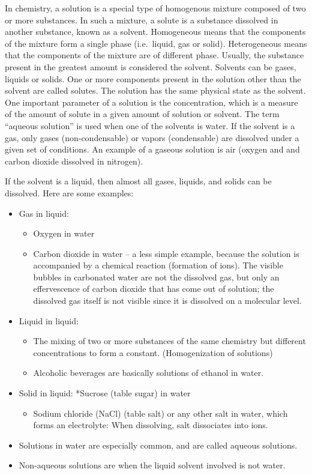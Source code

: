 In chemistry, a solution is a special type of homogenous mixture composed of two or more substances. In such a mixture, a solute is a substance dissolved in another substance, known as a solvent. Homogeneous means that the components of the mixture form a single phase (i.e.~liquid, gas or solid). Heterogeneous means that the components of the mixture are of different phase. Usually, the substance present in the greatest amount is considered the solvent. Solvents can be gases, liquids or solids. One or more components present in the solution other than the solvent are called solutes. The solution has the same physical state as the solvent. One important parameter of a solution is the concentration, which is a measure of the amount of solute in a given amount of solution or solvent. The term ``aqueous solution'' is used when one of the solvents is water. If the solvent is a gas, only gases (non-condensable) or vapors (condensable) are dissolved under a given set of conditions. An example of a gaseous solution is air (oxygen and and carbon dioxide dissolved in nitrogen).

If the solvent is a liquid, then almost all gases, liquids, and solids can be dissolved. Here are some examples:

\begin{itemize}
\tightlist
\item
  Gas in liquid:

  \begin{itemize}
  \tightlist
  \item
    Oxygen in water
  \item
    Carbon dioxide in water -- a less simple example, because the solution is accompanied by a chemical reaction (formation of ions). The visible bubbles in carbonated water are not the dissolved gas, but only an effervescence of carbon dioxide that has come out of solution; the dissolved gas itself is not visible since it is dissolved on a molecular level.
  \end{itemize}
\item
  Liquid in liquid:

  \begin{itemize}
  \tightlist
  \item
    The mixing of two or more substances of the same chemistry but different concentrations to form a constant. (Homogenization of solutions)
  \item
    Alcoholic beverages are basically solutions of ethanol in water.
  \end{itemize}
\item
  Solid in liquid:
  *Sucrose (table sugar) in water

  \begin{itemize}
  \tightlist
  \item
    Sodium chloride (NaCl) (table salt) or any other salt in water, which forms an electrolyte: When dissolving, salt dissociates into ions.
  \end{itemize}
\item
  Solutions in water are especially common, and are called aqueous solutions.
\item
  Non-aqueous solutions are when the liquid solvent involved is not water.
\end{itemize}

